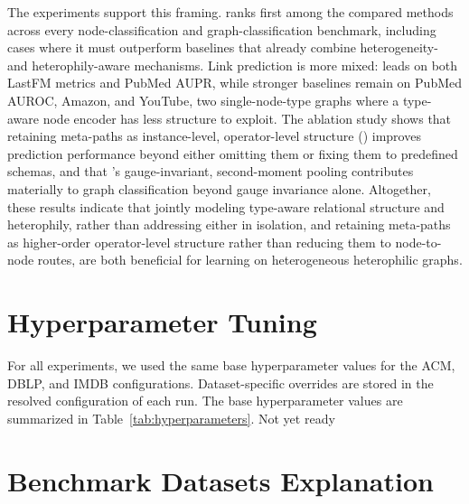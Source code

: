 The experiments support this framing. \method{} ranks first among the compared methods across every node-classification and graph-classification benchmark, including cases where it must outperform baselines that already combine heterogeneity- and heterophily-aware mechanisms. Link prediction is more mixed: \method{} leads on both LastFM metrics and PubMed AUPR, while stronger baselines remain on PubMed AUROC, Amazon, and YouTube, two single-node-type graphs where a type-aware node encoder has less structure to exploit. The ablation study shows that retaining meta-paths as instance-level, operator-level structure (\ampss{}) improves prediction performance beyond either omitting them or fixing them to predefined schemas, and that \sheafconvpool{}'s gauge-invariant, second-moment pooling contributes materially to graph classification beyond gauge invariance alone. Altogether, these results indicate that jointly modeling type-aware relational structure and heterophily, rather than addressing either in isolation, and retaining meta-paths as higher-order operator-level structure rather than reducing them to node-to-node routes, are both beneficial for learning on heterogeneous heterophilic graphs.




\appendix
\section{Hyperparameter Tuning}

For all experiments, we used the same base hyperparameter values for the ACM, DBLP, and IMDB configurations. Dataset-specific overrides are stored in the resolved configuration of each run. The base hyperparameter values are summarized in Table~\ref{tab:hyperparameters}.
Not yet ready
\label{app:hyperparameters}

\begin{table}[H]
  \centering
  \caption{Base hyperparameter values used in the ACM, DBLP, and IMDB
  configurations. Dataset-specific overrides are stored in the resolved
  configuration of each run.}
  \label{tab:hyperparameters}
  \small
  
\end{table}

\section{Benchmark Datasets Explanation}
\label{app:benchmark-datasets}

